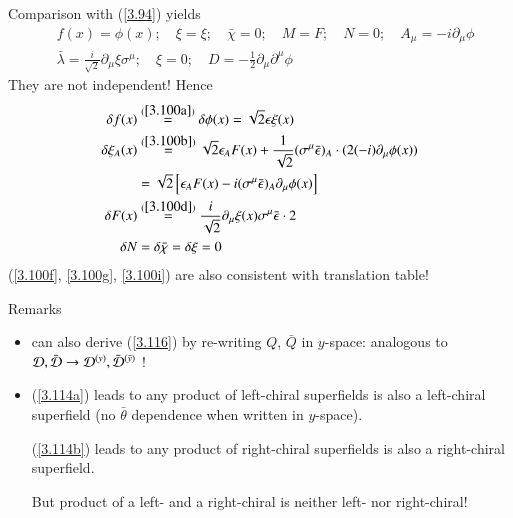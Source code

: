 Comparison with (\ref{3.94}) yields
\begin{align*}
   &f(x) = \phi(x);\quad \xi = \xi;\quad \bar\chi = 0;\quad M = F;\quad N=0;\quad A_\mu = -i\partial_\mu \phi \\
   &\bar\lambda = \frac{i}{\sqrt{2}} \partial_\mu \xi\sigma^\mu;\quad \xi=0;\quad D = -\frac{1}{2} \partial_\mu\partial^\mu \phi
\end{align*}
They are not independent! Hence
\begin{subequations}
   \label{3.116}
\begin{align}
   \delta f(x) &\stackrel{(\ref{3.100a})}{=} \delta \phi (x) = \sqrt{2} \epsilon \xi (x) \label{3.116a} \\
   \delta \xi_A(x) &\stackrel{(\ref{3.100b})}{=} \sqrt{2} \epsilon_A F(x) + \frac{1}{\sqrt{2}} (\sigma^\mu \bar\epsilon)_A \cdot (2(-i)\partial_\mu \phi(x)) \notag \\
                   &= \sqrt{2} \left[ \epsilon_A F(x) - i (\sigma^\mu \bar\epsilon)_A \partial_\mu \phi(x) \right] \label{3.116b} \\
   \delta F(x) &\stackrel{(\ref{3.100d})}{=} \frac{i}{\sqrt{2}} \partial_\mu \xi(x) \sigma^\mu \bar\epsilon \cdot 2 \label{3.116c} \\
   \delta N &= \delta \bar{\chi} = \delta \xi = 0 \label{3.116d}
\end{align}
\end{subequations}
(\ref{3.100f}, \ref{3.100g}, \ref{3.100i}) are also consistent with translation table!

Remarks
\begin{itemize}
   \item can also derive (\ref{3.116}) by re-writing $Q$, $\bar Q$ in $y$-space: analogous to $\mathcal{D}, \bar{\mathcal{D}} \rightarrow \mathcal{D}^{(y)}, \bar{\mathcal{D}}^{(\bar{y})}$ !
   \item (\ref{3.114a}) leads to any product of left-chiral superfields is also a left-chiral superfield (no $\bar\theta$ dependence when written in $y$-space).

      (\ref{3.114b}) leads to any product of right-chiral superfields is also a right-chiral superfield.

      But product of a left- and a right-chiral is neither left- nor right-chiral!
\end{itemize}

